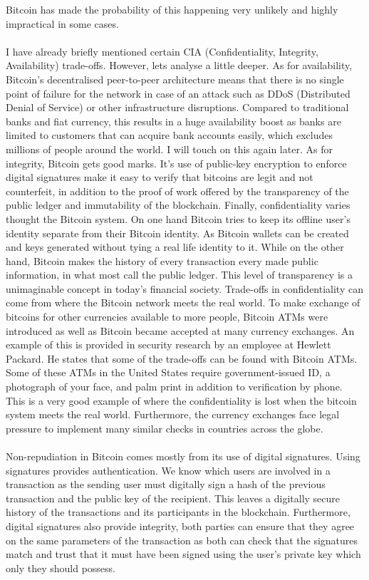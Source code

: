\documentclass[10pt, a4paper]{report}
\begin{document}
Bitcoin has made the probability of this happening very unlikely and highly impractical in
some cases.
\\\\
I have already briefly mentioned certain CIA (Confidentiality, Integrity, Availability) trade-offs.
However, lets analyse a little deeper.
As for availability, Bitcoin's decentralised peer-to-peer architecture
means that there is no single point of failure for the network in case of an
attack such as DDoS (Distributed Denial of Service) or other infrastructure disruptions.
Compared to traditional banks and fiat currency, this results in a huge availability boost
as banks are limited to customers that can acquire bank accounts easily, which
excludes millions of people around the world. I will touch on this again later.
As for integrity, Bitcoin gets good marks. It's use of public-key encryption to enforce
digital signatures make it easy to verify that bitcoins are legit and not counterfeit, in addition to
the proof of work offered by the transparency of the public ledger and immutability of the blockchain.
Finally, confidentiality varies thought the Bitcoin system. On one hand Bitcoin
tries to keep its offline user's identity separate from their Bitcoin identity.
As Bitcoin wallets can be created and keys generated without tying a real life identity
to it. While on the other hand, Bitcoin makes the history of every transaction every made public information,
in what most call the public ledger. This level of transparency is a unimaginable concept in today's
financial society.
Trade-offs in confidentiality can come from where the Bitcoin network meets the real world.
To make exchange of bitcoins for other currencies available to more people,
Bitcoin ATMs were introduced as well as Bitcoin became accepted at many currency exchanges.
An example of this is provided in security research by an employee at Hewlett Packard.
He states that some of the trade-offs can be found with Bitcoin ATMs. Some of these ATMs in the United States require
government-issued ID, a photograph of your face, and palm print in addition to verification
by phone. This is a very good example of where the confidentiality is lost when the bitcoin system
meets the real world. Furthermore, the currency exchanges face legal pressure to implement
many similar checks in countries across the globe.
\\\\
Non-repudiation in Bitcoin comes mostly from its use of digital signatures.
Using signatures provides authentication. We know which users are involved in
a transaction as the sending user must digitally sign a hash of the previous transaction
and the public key of the recipient. This leaves a digitally secure history of
the transactions and its participants in the blockchain. Furthermore, digital
signatures also provide integrity, both parties can ensure that they agree
on the same parameters of the transaction as both can check that the signatures
match and trust that it must have been signed using the user's private key which
only they should possess.
\end{document}
